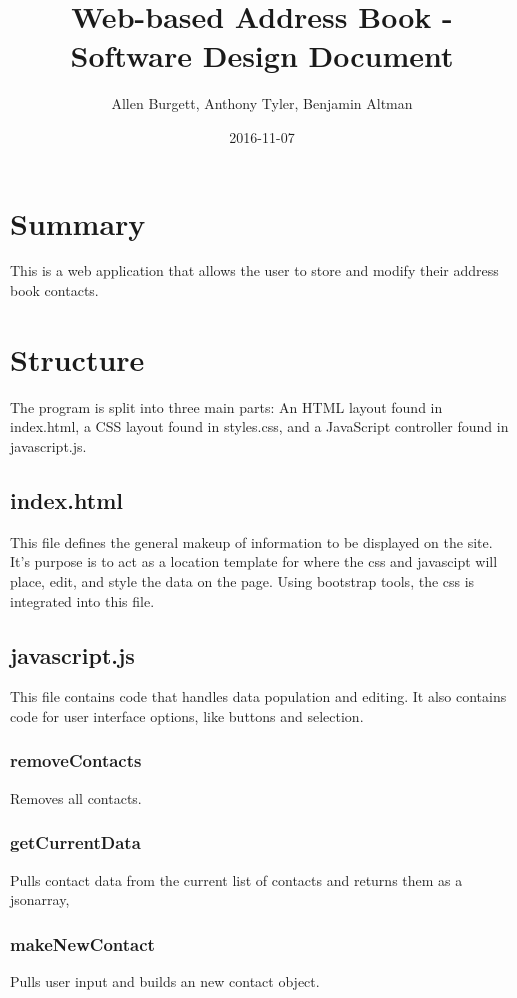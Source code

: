 \documentclass{article}
\title{Web-based Address Book - Software Design Document}
\date{2016-11-07}
\author{Allen Burgett, Anthony Tyler, Benjamin Altman}
\begin{document}
\maketitle
\pagebreak


\section{Summary}
This is a web application that allows the user to store and modify their address book contacts.

\section{Structure}
The program is split into three main parts: An HTML layout found in index.html, a CSS layout found in styles.css, and a JavaScript controller found in javascript.js.

\subsection{index.html}
This file defines the general makeup of information to be displayed on the site. It's purpose is to act as a location template for where the css and javascipt will place, edit, and style the data on the page. Using bootstrap tools, the css is integrated into this file. 

\subsection{javascript.js}
This file contains code that handles data population and editing. It also contains code for user interface options, like buttons and selection. 

\subsubsection{removeContacts}
Removes all contacts.

\subsubsection{getCurrentData}
Pulls contact data from the current list of contacts and returns them as a jsonarray,

\subsubsection{makeNewContact}
Pulls user input and builds an new contact object. 
\end{document}
